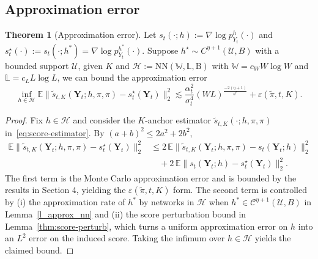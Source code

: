 \documentclass[12pt]{article}
\theoremstyle{definition} %
\newtheorem{theorem}{Theorem}
\newcommand{\Y}{\bm Y}
\providecommand{\E}{\mathbb{E}}
\begin{document}
\subsection{Approximation error}

\begin{theorem}[Approximation error]
\label{app:thm-approx-error}
Let $s_t(\cdot;h):=\nabla\log p_{Y_t}^h(\cdot)$ and $s_t^\star(\cdot):=s_t(\cdot;h^*)=\nabla\log p_{Y_t}^{h^*}(\cdot)$.
Suppose $h^{\star}\sim C^{\eta+1}(\mathcal{U},B)$ with a bounded support $\mathcal{U}$, given $K$ and $\mathcal{H}:=\mathrm{NN}(\mathbb{W},\mathbb{L},\mathrm{B})$ with $\mathbb{W}=c_W W\log W$ and $\mathbb{L}=c_L L\log L$, we can bound the approximation error 
\begin{equation}
\inf_{h\in \mathcal{H}}\E\|\widetilde s_{t,K}(\Y_t;h,\pi,\pi)-s_t^\star(\Y_t)\|_2^2\lesssim \frac{\alpha_t^2}{\sigma_t^4}(WL)^{\frac{-2(\eta+1)}{d^*}} + \varepsilon(\tilde{\pi},t,K).
\end{equation}
\end{theorem}
\begin{proof}
Fix $h\in\mathcal H$ and consider the $K$-anchor estimator $\widetilde s_{t,K}(\cdot;h,\pi,\pi)$ in~\eqref{eq:score-estimator}. By $(a+b)^2\le 2a^2+2b^2$,
\begin{align*}
\E\bigl\|\widetilde s_{t,K}(\Y_t;h,\pi,\pi)-s_t^\star(\Y_t)\bigr\|_2^2
&\le 2\,\E\bigl\|\widetilde s_{t,K}(\Y_t;h,\pi,\pi)-s_t(\Y_t;h)\bigr\|_2^2\\
&\quad+2\,\E\bigl\|s_t(\Y_t;h)-s_t^\star(\Y_t)\bigr\|_2^2.
\end{align*}
The first term is the Monte Carlo approximation error and is bounded by the results in Section 4, yielding the $\varepsilon(\tilde{\pi},t,K)$ form. The second term is controlled by (i) the approximation rate of $h^*$ by networks in $\mathcal H$ when $h^*\in\mathcal C^{\eta+1}(\mathcal U,B)$ in Lemma~\ref{l_approx_nn} and (ii) the score perturbation bound in Lemma~\ref{thm:score-perturb}, which turns a uniform approximation error on $h$ into an $L^2$ error on the induced score. Taking the infimum over $h\in\mathcal H$ yields the claimed bound.
\end{proof}
\end{document}
